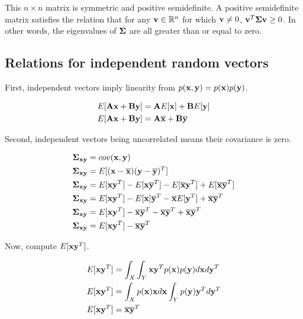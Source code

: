 This $n \times n$ matrix is symmetric and positive semidefinite. A positive
semidefinite matrix satisfies the relation that for any
$\mathbf{v} \in \mathbb{R}^n$ for which $\mathbf{v} \neq 0$,
$\mathbf{v}^T \mathbf{\Sigma} \mathbf{v} \geq 0$. In other words, the eigenvalues of
$\mathbf{\Sigma}$ are all greater than or equal to zero.

\subsection{Relations for independent random vectors}

First, independent vectors imply linearity from
$p(\mathbf{x}, \mathbf{y}) = p(\mathbf{x})p(\mathbf{y})$.

\begin{align*}
  E[\mathbf{A}\mathbf{x} + \mathbf{B}\mathbf{y}] &= \mathbf{A}E[\mathbf{x}] + \mathbf{B}E[\mathbf{y}] \\
  E[\mathbf{A}\mathbf{x} + \mathbf{B}\mathbf{y}] &= \mathbf{A}\overline{\mathbf{x}} + \mathbf{B}\overline{\mathbf{y}}
\end{align*}

Second, independent vectors being uncorrelated means their covariance is zero.

\begin{align}
  \mathbf{\Sigma}_{\mathbf{x}\mathbf{y}} &= cov(\mathbf{x}, \mathbf{y}) \nonumber \\
  \mathbf{\Sigma}_{\mathbf{x}\mathbf{y}} &= E[(\mathbf{x} - \overline{\mathbf{x}})
    (\mathbf{y} - \overline{\mathbf{y}})^T] \nonumber \\
  \mathbf{\Sigma}_{\mathbf{x}\mathbf{y}} &= E[\mathbf{x}\mathbf{y}^T] -
    E[\mathbf{x}\overline{\mathbf{y}}^T] - E[\overline{\mathbf{x}}\mathbf{y}^T] +
    E[\overline{\mathbf{x}}\overline{\mathbf{y}}^T] \nonumber \\
  \mathbf{\Sigma}_{\mathbf{x}\mathbf{y}} &= E[\mathbf{x}\mathbf{y}^T] -
    E[\mathbf{x}]\overline{\mathbf{y}}^T - \overline{\mathbf{x}}E[\mathbf{y}^T] +
    \overline{\mathbf{x}}\overline{\mathbf{y}}^T \nonumber \\
  \mathbf{\Sigma}_{\mathbf{x}\mathbf{y}} &= E[\mathbf{x}\mathbf{y}^T] -
    \overline{\mathbf{x}}\overline{\mathbf{y}}^T - \overline{\mathbf{x}}\overline{\mathbf{y}}^T +
    \overline{\mathbf{x}}\overline{\mathbf{y}}^T \nonumber \\
  \mathbf{\Sigma}_{\mathbf{x}\mathbf{y}} &= E[\mathbf{x}\mathbf{y}^T] -
    \overline{\mathbf{x}}\overline{\mathbf{y}}^T \label{eq:prb_sigma}
\end{align}

Now, compute $E[\mathbf{x}\mathbf{y}^T]$.

\begin{align}
  E[\mathbf{x}\mathbf{y}^T] &= \int_X \int_Y \mathbf{x}\mathbf{y}^T p(\mathbf{x})p(\mathbf{y})
    d\mathbf{x}d\mathbf{y}^T \nonumber \\
  E[\mathbf{x}\mathbf{y}^T] &= \int_X p(\mathbf{x}) \mathbf{x} d\mathbf{x}
    \int_Y p(\mathbf{y}) \mathbf{y}^T d\mathbf{y}^T \nonumber \\
  E[\mathbf{x}\mathbf{y}^T] &= \overline{\mathbf{x}}\overline{\mathbf{y}}^T \label{eq:prb_exyt}
\end{align}

